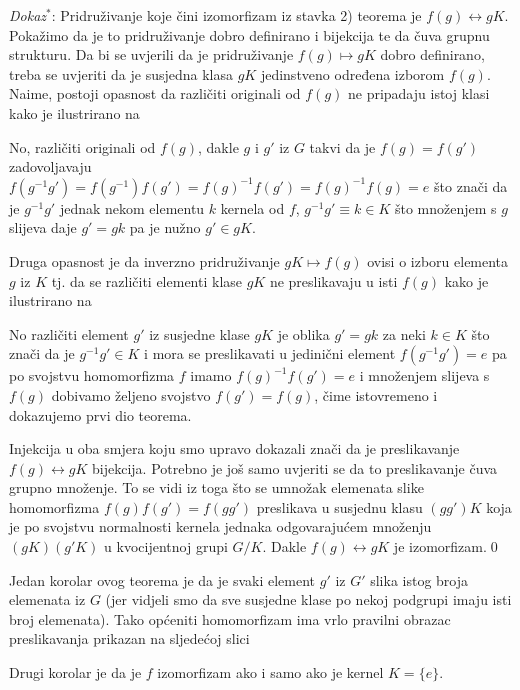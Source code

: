 \emph{Dokaz}$^{*}$: Pridruživanje koje
čini izomorfizam iz stavka 2) teorema je $f(g)\leftrightarrow gK$.
Pokažimo da je to pridruživanje dobro definirano i bijekcija te da čuva grupnu
strukturu.
Da bi se uvjerili da je pridruživanje $f(g)\mapsto gK$ dobro definirano, treba
se uvjeriti da je susjedna klasa $gK$ jedinstveno određena izborom $f(g)$. Naime,
postoji opasnost da različiti originali od $f(g)$ ne pripadaju istoj klasi
kako je ilustrirano na\\[2ex]
\vspace*{3ex}
\centerline{}
No, različiti originali od $f(g)$, dakle $g$ i $g'$ iz $G$
takvi da je  $f(g)=f(g')$ zadovoljavaju
$f(g^{-1} g')=f(g^{-1})f(g')=f(g)^{-1}f(g')=f(g)^{-1}f(g)=e$ što  znači
da je $g^{-1} g'$ jednak nekom elementu $k$ kernela od $f$,
$g^{-1} g' \equiv k\in K$ što množenjem s $g$ slijeva
daje $g'=gk$ pa je nužno $g' \in gK$.


Druga opasnost je da inverzno pridruživanje
$gK\mapsto f(g)$ ovisi o izboru elementa $g$ iz $K$ tj. da
se različiti elementi klase $gK$ ne preslikavaju u isti $f(g)$
kako je ilustrirano na\\[2ex]
\vspace*{3ex}
\centerline{}
No različiti element $g'$ iz susjedne klase $gK$ je oblika $g'=gk$ za neki
$k\in K$ što znači da je $g^{-1} g'\in K$ i mora se preslikavati
u jedinični element
$f(g^{-1}g')=e$ pa po svojstvu homomorfizma $f$ imamo 
$f(g)^{-1}f(g')=e$ i množenjem slijeva s $f(g)$ dobivamo željeno
svojstvo $f(g')=f(g)$, čime istovremeno i dokazujemo prvi dio teorema.

Injekcija u oba smjera koju smo upravo dokazali znači da je
preslikavanje $f(g)\leftrightarrow gK$ bijekcija. Potrebno je još samo
uvjeriti se da to preslikavanje čuva grupno množenje. To se vidi iz toga
što se umnožak elemenata slike homomorfizma $f(g)f(g')=f(gg')$ preslikava
u susjednu klasu $(gg')K$ koja je po svojstvu normalnosti kernela jednaka
odgovarajućem množenju $(gK)(g'K)$ u kvocijentnoj grupi $G/K$.
Dakle $f(g)\leftrightarrow gK$ je izomorfizam.\qed
  


Jedan korolar ovog teorema je da je svaki element $g'$ iz $G'$ slika
istog broja elemenata iz $G$ (jer vidjeli smo da sve susjedne klase po
nekoj podgrupi imaju isti broj elemenata). Tako općeniti homomorfizam
ima vrlo pravilni obrazac preslikavanja prikazan na sljedećoj slici\\[2ex]
\vspace*{4ex}
\centerline{}
Drugi korolar je da je $f$ izomorfizam ako i
samo ako je kernel $K=\{e\}$.

